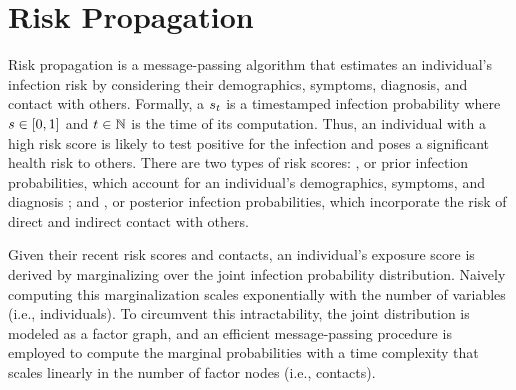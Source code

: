 \chapter{Risk Propagation}\label{ch:risk-propagation}

Risk propagation is a message-passing algorithm that estimates an individual's infection risk by considering their demographics, symptoms, diagnosis, and contact with others. Formally, a  $s_t$ is a timestamped infection probability where $s \in [0, 1]$ and $t \in \mathbb{N}$ is the time of its computation. Thus, an individual with a high risk score is likely to test positive for the infection and poses a significant health risk to others. There are two types of risk scores: , or prior infection probabilities, which account for an individual's demographics, symptoms, and diagnosis \citep{Menni2020}; and , or posterior infection probabilities, which incorporate the risk of direct and indirect contact with others.

Given their recent risk scores and contacts, an individual's exposure score is derived by marginalizing over the joint infection probability distribution. Naively computing this marginalization scales exponentially with the number of variables (i.e., individuals). To circumvent this intractability, the joint distribution is modeled as a factor graph, and an efficient message-passing procedure is employed to compute the marginal probabilities with a time complexity that scales linearly in the number of factor nodes (i.e., contacts).

